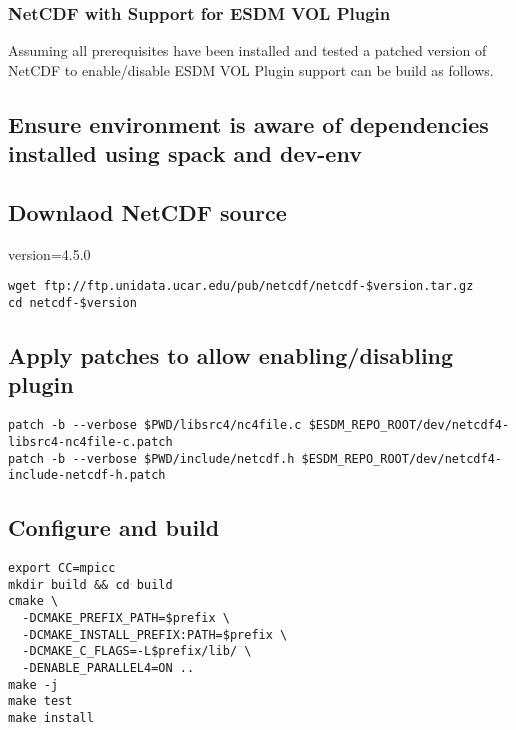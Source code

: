 \subsubsection{NetCDF with Support for ESDM VOL Plugin}%
\label{netcdf-with-support-for-esdm-vol-plugin}

Assuming all prerequisites have been installed and tested a patched version of NetCDF to enable/disable ESDM VOL Plugin support can be build as follows.

\subsection{Ensure environment is aware of dependencies installed using spack and dev-env}%
\label{ensure-environment-is-aware-of-dependencies-installed-using-spack-and-dev-env-1}

\subsection{Downlaod NetCDF source}%
\label{downlaod-netcdf-source}

version=4.5.0

\begin{lstlisting}
wget ftp://ftp.unidata.ucar.edu/pub/netcdf/netcdf-$version.tar.gz
cd netcdf-$version
\end{lstlisting}

\subsection{Apply patches to allow enabling/disabling plugin}%
\label{apply-patches-to-allow-enablingdisabling-plugin}

\begin{lstlisting}
patch -b --verbose $PWD/libsrc4/nc4file.c $ESDM_REPO_ROOT/dev/netcdf4-libsrc4-nc4file-c.patch
patch -b --verbose $PWD/include/netcdf.h $ESDM_REPO_ROOT/dev/netcdf4-include-netcdf-h.patch
\end{lstlisting}

\subsection{Configure and build}%
\label{configure-and-build}

\begin{lstlisting}
export CC=mpicc
mkdir build && cd build
cmake \
  -DCMAKE_PREFIX_PATH=$prefix \
  -DCMAKE_INSTALL_PREFIX:PATH=$prefix \
  -DCMAKE_C_FLAGS=-L$prefix/lib/ \
  -DENABLE_PARALLEL4=ON ..
make -j
make test
make install
\end{lstlisting}

